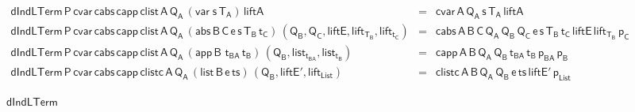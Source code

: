 \documentclass[9pt]{entcs}
\begin{document}
\begin{figure*}[t]

  \begin{adjustbox}{varwidth=6.8in, max width=6.6in, margin=-0.1in 0in
      -0.2in 0in, fbox, center} 
{\small
\[\begin{array}{lll}
\mathsf{dIndLTerm \, P\, cvar \, cabs\, capp\, clist \, A\, Q_A\,
  (var\;s\,T_A) \, liftA} & = & \mathsf{cvar \, A\, Q_A\, s\, T_A\,
  liftA}\\ 
\mathsf{dIndLTerm \, P\, cvar \, cabs\, capp\, clist \, A\, Q_A\,
  (abs \,B \,C \,e \,s \,T_B \, t_C) \, (Q_B , Q_C , liftE,
  lift_{T_B}, lift_{t_C})} & = & \mathsf{cabs\,A\,B\,C\, Q_A\,
  Q_B\, Q_C\, e\, s\, T_B\, t_C\, liftE\, lift_{T_B}\, p_C}\\
\mathsf{dIndLTerm \, P\, cvar \, cabs\, capp\, clist \, A\, Q_A\,
    (app \,B \,\,t_{BA} \, t_B)\, (Q_B , list_{t_{BA}}, list_{t_B})} &
= & \mathsf{capp\,A\,B\,Q_A\, Q_B\, t_{BA}\, t_B\, p_{BA} \, p_B}\\
  \mathsf{dIndLTerm \, P\, cvar \, cabs\, capp\, clistc \, A\, Q_A\,
    (list \,B \,e \, ts) \, (Q_B , liftE', lift_{List})} & = & 
  \mathsf{clistc \,A\,B\,Q_A\, Q_B\, e\, ts\, liftE'\, p_{List} }
\end{array}\]}

\vspace*{-0.1in}

\caption{$\mathsf{dIndLTerm}$}\label{fig:dindlterm} \vspace*{0.1in} 
\end{adjustbox}
\end{figure*}
\end{document}
